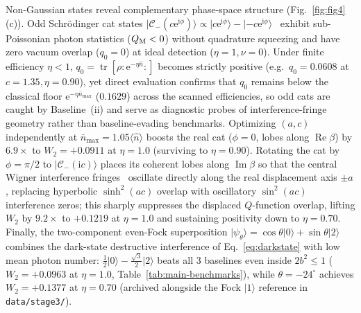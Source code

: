 \documentclass{iopjournal}
\newcommand{\tr}{\operatorname{tr}}
\newcommand{\RePart}{\operatorname{Re}}
\newcommand{\ImPart}{\operatorname{Im}}
\newcommand{\Cset}{\mathcal{C}}
\newcommand{\nbar}{\bar n_{\max}}
\newcommand{\ket}[1]{\lvert #1\rangle}
\newcommand{\ii}{\mathrm{i}}
\newcommand{\ee}{\mathrm{e}}
\begin{document}
Non-Gaussian states reveal complementary phase-space structure (Fig.~\ref{fig:fig4}(c)). Odd Schr\"odinger cat states $\ket{\Cset_-(c\ee^{\ii\phi})} \propto \ket{c\ee^{\ii\phi}} - \ket{-c\ee^{\ii\phi}}$~\cite{GerryKnight2005,Ourjoumtsev2007,Lewenstein2021} exhibit sub-Poissonian photon statistics ($Q_{\rm M} < 0$) without quadrature squeezing and have zero vacuum overlap ($q_0 = 0$) at ideal detection ($\eta = 1, \nu = 0$). Under finite efficiency $\eta < 1$, $q_0 = \tr[\rho :\!\ee^{-\eta\hat n}\!:]$ becomes strictly positive (e.g.\ $q_0 = 0.0608$ at $c = 1.35, \eta = 0.90$), yet direct evaluation confirms that $q_0$ remains below the classical floor $\ee^{-\eta\nbar}$ ($0.1629$) across the scanned efficiencies, so odd cats are caught by Baseline~(ii) and serve as diagnostic probes of interference-fringe geometry rather than baseline-evading benchmarks. Optimizing $(a,c)$ independently at $\nbar = 1.05\langle\hat n\rangle$ boosts the real cat ($\phi = 0$, lobes along $\RePart\beta$) by $6.9\times$ to $W_2 = +0.0911$ at $\eta = 1.0$ (surviving to $\eta = 0.90$). Rotating the cat by $\phi = \pi/2$ to $\ket{\Cset_-(\ii c)}$ places its coherent lobes along $\ImPart\beta$ so that the central Wigner interference fringes~\cite{GerryKnight2005} oscillate directly along the real displacement axis $\pm a$, replacing hyperbolic $\sinh^2(ac)$ overlap with oscillatory $\sin^2(ac)$ interference zeros; this sharply suppresses the displaced $Q$-function overlap, lifting $W_2$ by $9.2\times$ to $+0.1219$ at $\eta = 1.0$ and sustaining positivity down to $\eta = 0.70$. Finally, the two-component even-Fock superposition $\ket{\psi_\theta} = \cos\theta\ket{0} + \sin\theta\ket{2}$ combines the dark-state destructive interference of Eq.~\eqref{eq:darkstate} with low mean photon number: $\frac{1}{2}\ket{0}-\frac{\sqrt{3}}{2}\ket{2}$ beats all 3 baselines even inside $2b^2 \le 1$ ($W_2 = +0.0963$ at $\eta = 1.0$, Table~\ref{tab:main-benchmarks}), while $\theta = -24^\circ$ achieves $W_2 = +0.1377$ at $\eta = 0.70$ (archived alongside the Fock $\ket{1}$ reference in \texttt{data/stage3/}).
\end{document}
